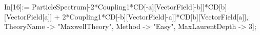In[16]:= ParticleSpectrum[-2*Coupling1*CD[-a][VectorField[-b]]*CD[b][VectorField[a]] + 2*Coupling1*CD[-b][VectorField[-a]]*CD[b][VectorField[a]], TheoryName -> "MaxwellTheory", Method -> "Easy", MaxLaurentDepth -> 3]; 